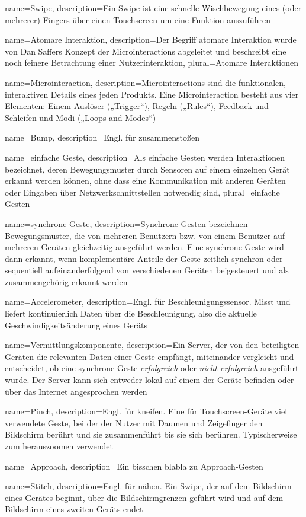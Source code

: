 {
    name=Swipe,
    description={Ein Swipe ist eine schnelle Wischbewegung eines (oder mehrerer) Fingers über einen Touchscreen um eine Funktion auszuführen}
}

{
    name=Atomare Interaktion,
    description={Der Begriff atomare Interaktion wurde von Dan Saffers Konzept der Microinteractions abgeleitet und beschreibt eine noch feinere Betrachtung einer Nutzerinteraktion},
    plural={Atomare Interaktionen}
}

{
    name=Microinteraction,
    description={Microinteractions sind die funktionalen, interaktiven Details eines jeden Produkts. Eine Microinteraction besteht aus vier Elementen: Einem Auslöser („Trigger“), Regeln („Rules“), Feedback und Schleifen und Modi („Loops and Modes“)}
}

{
	name=Bump,
	description={Engl. für zusammenstoßen}
}

{
	name=einfache Geste,
	description={Als einfache Gesten werden Interaktionen bezeichnet, deren Bewegungsmuster durch Sensoren auf einem einzelnen Gerät erkannt werden können, ohne dass eine Kommunikation mit anderen Geräten oder Eingaben über Netzwerkschnittstellen notwendig sind},
	plural={einfache Gesten}
}

{
	name=synchrone Geste,
	description={Synchrone Gesten bezeichnen Bewegungsmuster, die von mehreren Benutzern bzw. von einem Benutzer auf mehreren Geräten gleichzeitig ausgeführt werden. Eine synchrone Geste wird dann erkannt, wenn komplementäre Anteile der Geste zeitlich synchron oder sequentiell aufeinanderfolgend von verschiedenen Geräten beigesteuert und als zusammengehörig erkannt werden \citep{Hinckley2003}}
}

{
	name=Accelerometer,
	description={Engl. für Beschleunigungssensor. Misst und liefert kontinuierlich Daten über die Beschleunigung, also die aktuelle Geschwindigkeitsänderung eines Geräts}
}

{
	name=Vermittlungskomponente,
	description={Ein Server, der von den beteiligten Geräten die relevanten Daten einer Geste empfängt, miteinander vergleicht und entscheidet, ob eine synchrone Geste \textit{erfolgreich} oder \textit{nicht erfolgreich} ausgeführt wurde. Der Server kann sich entweder lokal auf einem der Geräte befinden oder über das Internet angesprochen werden}
}

{
	name=Pinch,
	description={Engl. für kneifen. Eine für Touchscreen-Geräte viel verwendete Geste, bei der der Nutzer mit Daumen und Zeigefinger den Bildschirm berührt und sie zusammenführt bis sie sich berühren. Typischerweise zum herauszoomen verwendet}
}

{
	name=Approach,
	description={Ein bisschen blabla zu Approach-Gesten}
}

{
	name=Stitch,
	description={Engl. für nähen. Ein Swipe, der auf dem Bildschirm eines Gerätes beginnt, über die Bildschirmgrenzen geführt wird und auf dem Bildschirm eines zweiten Geräts endet}
}